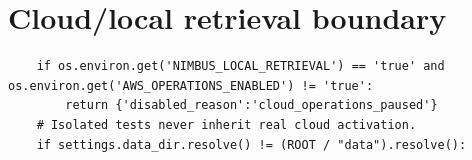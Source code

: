 \section{Cloud/local retrieval boundary}
\begin{lstlisting}
    if os.environ.get('NIMBUS_LOCAL_RETRIEVAL') == 'true' and os.environ.get('AWS_OPERATIONS_ENABLED') != 'true':
        return {'disabled_reason':'cloud_operations_paused'}
    # Isolated tests never inherit real cloud activation.
    if settings.data_dir.resolve() != (ROOT / "data").resolve():
\end{lstlisting}
